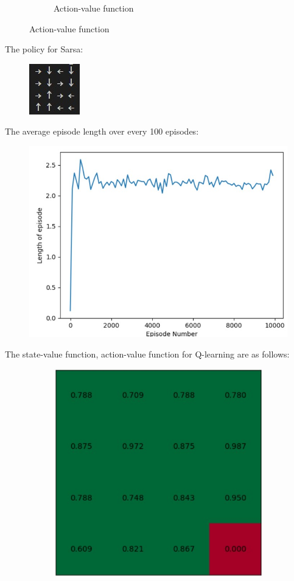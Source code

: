 \documentclass{article}
\begin{document}
\begin{enumerate}
\begin{figure}[H]
\begin{subfigure}[b]{0.5\linewidth}
		\caption{Action-value function}
	\end{subfigure}
\end{figure}
The policy for Sarsa:
\begin{figure}[H]
	\centering
	\includegraphics{SarsaPolicy2.jpg}
\end{figure}
The average episode length over every 100 episodes:
\begin{figure}[H]
	\centering
	\includegraphics[scale = 0.5]{SarsaPlot2.jpg}
\end{figure}
The state-value function, action-value function for Q-learning are as follows:
\begin{figure}[H]
	\begin{subfigure}[b]{0.5\linewidth}
		\includegraphics[width = \linewidth]{QV2.jpg}

\end{subfigure}
\end{figure}
\end{enumerate}
\end{document}
